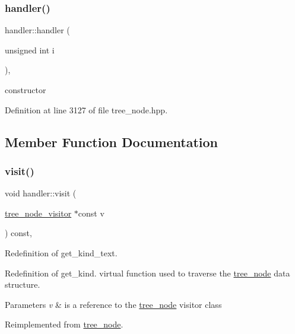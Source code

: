 \subsubsection{\texorpdfstring{handler()}{handler()}}
{\footnotesize\ttfamily handler\+::handler (\begin{DoxyParamCaption}\item[{unsigned int}]{i }\end{DoxyParamCaption})\hspace{0.3cm}{\ttfamily [inline]}, {\ttfamily [explicit]}}



constructor 



Definition at line 3127 of file tree\+\_\+node.\+hpp.



\subsection{Member Function Documentation}
\mbox{\label{structhandler_a59a457d67ccce8a01c0025929abba5a1}} 
\subsubsection{\texorpdfstring{visit()}{visit()}}
{\footnotesize\ttfamily void handler\+::visit (\begin{DoxyParamCaption}\item[{\hyperlink{classtree__node__visitor}{tree\+\_\+node\+\_\+visitor} $\ast$const}]{v }\end{DoxyParamCaption}) const\hspace{0.3cm}{\ttfamily [override]}, {\ttfamily [virtual]}}



Redefinition of get\+\_\+kind\+\_\+text. 

Redefinition of get\+\_\+kind. virtual function used to traverse the \hyperlink{classtree__node}{tree\+\_\+node} data structure. 
\begin{DoxyParams}{Parameters}
{\em v} & is a reference to the \hyperlink{classtree__node}{tree\+\_\+node} visitor class \\
\hline
\end{DoxyParams}


Reimplemented from \hyperlink{classtree__node_aa9abba3f1b30e0be80b4a56b188c6ecc}{tree\+\_\+node}.



